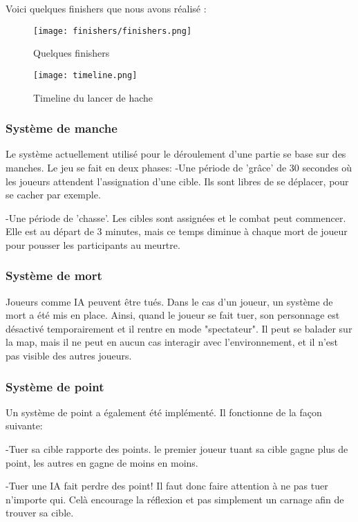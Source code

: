 Voici quelques finishers que nous avons réalisé :

\begin{figure}[hbt!]
    \centering
    \texttt{[image: finishers/finishers.png]}
    \caption{Quelques finishers}
\end{figure}

\FloatBarrier
\begin{figure}[hbt!]
    \centering
    \texttt{[image: timeline.png]}
    \caption{Timeline du lancer de hache}
\end{figure}


\subsubsection{Système de manche}
    Le système actuellement utilisé pour le déroulement d'une partie se base sur des manches. Le jeu se fait en deux phases:
    	-Une période de 'grâce' de 30 secondes où les joueurs attendent l'assignation d'une cible. 
	 Ils sont libres de se déplacer, pour se cacher par exemple.

	-Une période de 'chasse'. Les cibles sont assignées et le combat peut commencer. Elle est au départ de 3 minutes, mais ce temps
	 diminue à chaque mort de joueur pour pousser les participants au meurtre.

\subsubsection{Système de mort}
    Joueurs comme IA peuvent être tués. Dans le cas d'un joueur, un système de mort a été mis en place. Ainsi,
    quand le joueur se fait tuer, son personnage est désactivé temporairement et il rentre
    en mode "spectateur". Il peut se balader sur la map, mais il ne peut en aucun cas interagir avec l'environnement,
	et il n'est pas visible des autres joueurs.

\subsubsection{Système de point}
    Un système de point a également été implémenté. Il fonctionne de la façon suivante:
    
	-Tuer sa cible rapporte des points. le premier joueur tuant sa cible gagne plus de point, les autres en gagne de moins en moins.
	
	-Tuer une IA fait perdre des point! Il faut donc faire attention à ne pas tuer n'importe qui. Celà encourage la réflexion et pas simplement un carnage afin de trouver sa cible.
	
